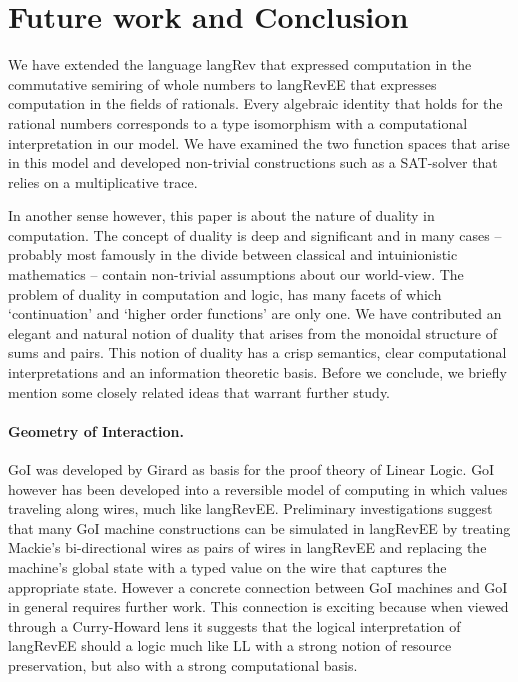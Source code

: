 \documentclass[preprint]{sigplanconf}
\begin{document}
\section{Future work and Conclusion}
\label{sec:conc}

We have extended the language {{langRev}} that expressed computation
in the commutative semiring of whole numbers to {{langRevEE}} that
expresses computation in the fields of rationals.  Every algebraic
identity that holds for the rational numbers corresponds to a type
isomorphism with a computational interpretation in our model. We have
examined the two function spaces that arise in this model and
developed non-trivial constructions such as a SAT-solver that relies
on a multiplicative trace.

In another sense however, this paper is about the nature of duality in
computation. The concept of duality is deep and significant and in
many cases -- probably most famously in the divide between classical
and intuinionistic mathematics -- contain non-trivial assumptions
about our world-view.  The problem of duality in computation and
logic, has many facets of which `continuation' and `higher order
functions' are only one.  We have contributed an elegant and natural
notion of duality that arises from the monoidal structure of sums and
pairs. This notion of duality has a crisp semantics, clear
computational interpretations and an information theoretic basis.
Before we conclude, we briefly mention some closely related ideas that
warrant further study.


\paragraph*{Geometry of Interaction.}
GoI was developed by Girard \cite{girard1989geometry}as basis for the
proof theory of Linear Logic.  GoI however has been developed into a
reversible model of computing
\cite{Mackie2011,DBLP:conf/popl/Mackie95,Abramsky:1994:NFG:184662.184664}
in which values traveling along wires, much like {{langRevEE}}.
Preliminary investigations suggest that many GoI machine constructions
can be simulated in {{langRevEE}} by treating Mackie's bi-directional
wires as pairs of wires in {{langRevEE}} and replacing the machine's
global state with a typed value on the wire that captures the
appropriate state.  However a concrete connection between GoI machines
and GoI in general requires further work. This connection is exciting
because when viewed through a Curry-Howard lens it suggests that the
logical interpretation of {{langRevEE}} should a logic much like LL
with a strong notion of resource preservation, but also with a strong
computational basis.
\end{document}
